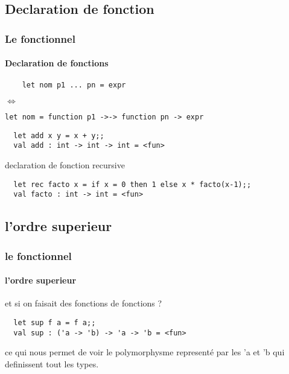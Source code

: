 \subsection{Declaration de fonction}
\begin{frame}[fragile]
  \frametitle{Le fonctionnel}
  \framesubtitle{Declaration de fonctions}
    \begin{lstlisting}
	let nom p1 ... pn = expr
    \end{lstlisting}
	\begin{center}
	  \begin{rotate}{90}
     $\Leftrightarrow$
   \end{rotate}
\end{center}
\begin{lstlisting}
let nom = function p1 ->-> function pn -> expr
  \end{lstlisting}
  \vspace{1cm}
  \begin{lstlisting}
  let add x y = x + y;;
  val add : int -> int -> int = <fun>
  \end{lstlisting}
  declaration de fonction recursive 
  \begin{lstlisting}
  let rec facto x = if x = 0 then 1 else x * facto(x-1);;
  val facto : int -> int = <fun>
  \end{lstlisting}
\end{frame}
\subsection{l'ordre superieur}
\begin{frame}[fragile]
  \frametitle{le fonctionnel}
  \framesubtitle{l'ordre superieur}
  et si on faisait des fonctions de fonctions ? 
 \begin{lstlisting}
  let sup f a = f a;;
  val sup : ('a -> 'b) -> 'a -> 'b = <fun>
 \end{lstlisting}
 ce qui nous permet de voir le polymorphysme representé par les 'a et 'b qui definissent tout les types.
\end{frame}

